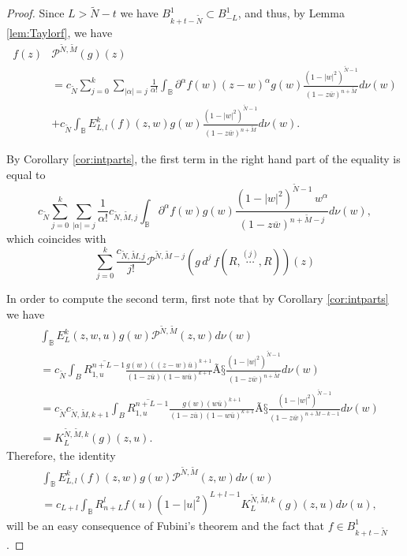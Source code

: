 \documentclass[12pt,twoside,leqno,final]{amsart}
\theoremstyle{plain}
\begin{document}
\begin{proof} Since $L>\tilde N-t$ we have $B^1_{k+t-\tilde N}\subset B^1_{-L}$, and thus, 
by Lemma \ref{lem:Taylorf}, we have
\begin{align*}
f(z) &{{\mathcal P}}^{\tilde N,\tilde M} (g)(z)\\
&=c_{\tilde N}\sum_{j=0}^k\sum_{|\alpha|=j}\frac{1}{\alpha!}
\int_{{\mathbb B}} {\partial}^\alpha f(w) (z-w)^\alpha g(w)
\frac{(1-|w|^2)^{\tilde N-1}}{(1-z\overline w)^{n+\tilde M}}d\nu(w)\\
&+c_{\tilde N}\int_{{\mathbb B}} E^k_{L,l}(f)(z,w) g(w)
\frac{(1-|w|^2)^{\tilde N-1}}{(1-z\overline w)^{n+\tilde M}}d\nu(w). 
\end{align*}

By Corollary \ref{cor:intparts}, the first term in the right hand part 
of the equality is equal to 
$$
c_{\tilde N}\sum_{j=0}^k\sum_{|\alpha|=j}\frac{1}{\alpha!}
c_{\tilde N,\tilde M,j}\int_{{\mathbb B}} {\partial}^\alpha f(w) g(w)
 \frac{(1-|w|^2)^{\tilde N-1}\,w^\alpha}{(1-z\overline w)^{n+\tilde M-j}}d\nu(w),
$$
which coincides with
$$
\sum_{j=0}^k \frac{c_{\tilde N,\tilde M,j}}{j!} 
{{\mathcal P}}^{\tilde N,\tilde M-j}\left(g\,d^j\,f(R,\overset{(j)}{\cdots},R)\right)(z)
$$

In order to compute the second term, first note that by Corollary \ref{cor:intparts} we have
\begin{align*}
&\int_{{\mathbb B}} E^k_{L}(z,w,u) g(w) {{\mathcal P}}^{\tilde N,\tilde M}(z,w)d\nu(w)\\
&=c_{\tilde N}\int_B \overline{R^{n+L-1}_{1,u}}\frac{g(w) ((z-w)\overline u)^{k+1}}{(1-z\overline u)(1-w\overline u)^{k+1}} Ã§
\frac{(1-|w|^2)^{\tilde N-1}}{(1-z\overline w)^{n+\tilde M}}d\nu(w)\\
&=c_{\tilde N}c_{\tilde N,\tilde M,k+1}\int_B \overline{R^{n+L-1}_{1,u}}
\frac{g(w)(w\overline u)^{k+1}}{(1-z\overline u)(1-w\overline u)^{k+1}} Ã§
\frac{(1-|w|^2)^{\tilde N-1}}{(1-z\overline w)^{n+\tilde M-k-1}}d\nu(w)\\
&=K^{\tilde N,\tilde M,k}_L(g)(z,u).
\end{align*}
Therefore, the identity
\begin{equation}\label{eqn:formula}\begin{split}
&\int_{{\mathbb B}} E^k_{L,l}(f)(z,w) g(w) {{\mathcal P}}^{\tilde N,\tilde M}(z,w)d\nu(w)\\
&=c_{L+l}\int_{{\mathbb B}} R^l_{n+L} f(u)(1-|u|^2)^{L+l-1}K^{\tilde N,\tilde M,k}_L(g)(z,u) d\nu(u),
\end{split}\end{equation}
will be an easy consequence of Fubini's theorem and the fact that $f\in B^1_{k+t-\tilde N}$. 
\end{proof}
\end{document}
